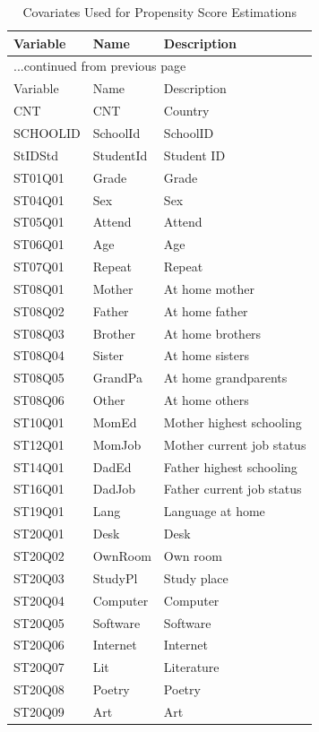 \documentclass[letterpaper,11pt]{article}
\begin{document}
\begin{longtable}{lll}
\caption{Covariates Used for Propensity Score Estimations} \\ 
  \hline
  Variable & Name & Description \\ \endfirsthead \multicolumn{3}{l}{{...continued from previous page}}\\ \hline Variable & Name & Description  \\ \hline \endhead \hline
CNT & CNT & Country \\ 
  SCHOOLID & SchoolId & SchoolID \\ 
  StIDStd & StudentId & Student ID \\ 
  ST01Q01 & Grade & Grade \\ 
  ST04Q01 & Sex & Sex \\ 
  ST05Q01 & Attend & Attend \\ 
  ST06Q01 & Age & Age \\ 
  ST07Q01 & Repeat & Repeat \\ 
  ST08Q01 & Mother & At home mother \\ 
  ST08Q02 & Father & At home father \\ 
  ST08Q03 & Brother & At home brothers \\ 
  ST08Q04 & Sister & At home sisters \\ 
  ST08Q05 & GrandPa & At home grandparents \\ 
  ST08Q06 & Other & At home others \\ 
  ST10Q01 & MomEd & Mother highest schooling \\ 
  ST12Q01 & MomJob & Mother current job status \\ 
  ST14Q01 & DadEd & Father highest schooling \\ 
  ST16Q01 & DadJob & Father current job status \\ 
  ST19Q01 & Lang & Language at home \\ 
  ST20Q01 & Desk & Desk \\ 
  ST20Q02 & OwnRoom & Own room \\ 
  ST20Q03 & StudyPl & Study place \\ 
  ST20Q04 & Computer & Computer \\ 
  ST20Q05 & Software & Software \\ 
  ST20Q06 & Internet & Internet \\ 
  ST20Q07 & Lit & Literature \\ 
  ST20Q08 & Poetry & Poetry \\ 
  ST20Q09 & Art & Art \\ 

\end{longtable}
\end{document}
